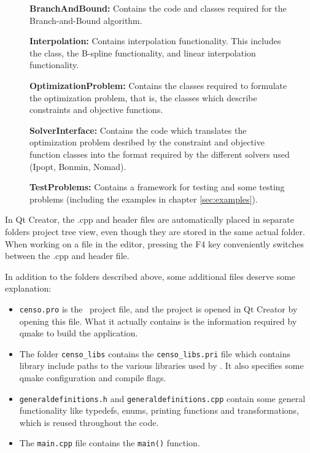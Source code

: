 \begin{figure}
{  	\textbf{BranchAndBound:} Contains the code and classes required for the Branch-and-Bound algorithm.
  
  	\textbf{Interpolation:} Contains interpolation functionality. This includes the  class, the B-spline functionality, and linear interpolation functionality.

	\textbf{OptimizationProblem:} Contains the classes required to formulate the optimization problem, that is, the classes which describe constraints and objective functions.

	\textbf{SolverInterface:} Contains the code which translates the optimization problem desribed by the constraint and objective function classes into the format required by the different solvers used (Ipopt, Bonmin, Nomad).

	\textbf{TestProblems:} Contains a framework for testing and some testing problems (including the examples in chapter \ref{sec:examples}).
}
\end{figure}
In Qt Creator, the .cpp and header files are automatically placed in separate folders project tree view, even though they are stored in the same actual folder. When working on a file in the editor, pressing the F4 key conveniently switches between the .cpp and header file.

In addition to the folders described above, some additional files deserve some explanation:
\begin{itemize}
\item
\texttt{censo.pro} is the \solvername\ project file, and the project is opened in Qt Creator by opening this file. What it actually contains is the information required by qmake to build the application.
\item
The folder \texttt{censo\_libs} contains the \texttt{censo\_libs.pri} file which contains library include paths to the various libraries used by \solvername. It also specifies some qmake configuration and compile flags.
\item
\texttt{generaldefinitions.h} and \texttt{generaldefinitions.cpp} contain some general functionality like typedefs, enums, printing functions and transformations, which is reused throughout the code. 
\item
The \texttt{main.cpp} file contains the \texttt{main()} function.
\end{itemize}